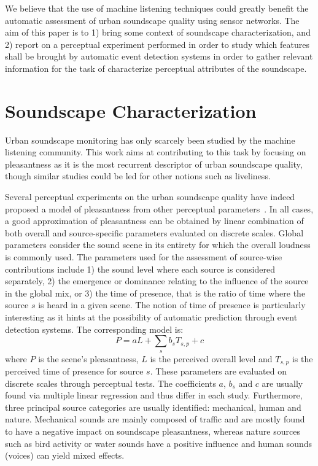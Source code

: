 \documentclass{article}
\begin{document}
\begin{sloppy}
We believe that the use of machine listening techniques could greatly benefit the automatic assessment of urban soundscape quality using sensor networks. %
The aim of this paper is to 1) bring some context of soundscape characterization, and 2) report on a perceptual experiment performed in order to study which features shall be brought by automatic event detection systems in order to gather relevant information for the task of characterize perceptual attributes of the soundscape.


\section{Soundscape Characterization}
\label{sec:char}

Urban soundscape monitoring has only scarcely been studied by the machine listening community\cite{bello2018}. This work aims at contributing to this task by focusing on pleasantness as it is the most recurrent descriptor of urban soundscape quality, though similar studies could be led for other notions such as liveliness.

Several perceptual experiments on the urban soundscape quality have indeed proposed a model of pleasantness from other perceptual parameters~\cite{nilsson2007, axelsson2010, aumond2017, ricciardi2014}. In all cases, a good approximation of pleasantness can be obtained by linear combination of both overall and source-specific parameters evaluated on discrete scales. Global parameters consider the sound scene in its entirety for which the overall loudness is commonly used. The parameters used for the assessment of source-wise contributions include 1) the sound level where each source is considered separately, 2) the emergence or dominance relating to the influence of the source in the global mix, or 3) the time of presence, that is the ratio of time where the source $s$ is heard in a given scene. The notion of time of presence is particularly interesting as it hints at the possibility of automatic prediction through event detection systems. The corresponding model is:
\begin{equation}
P = aL + \sum_s b_sT_{s,p} + c
\end{equation}
where $P$ is the scene's pleasantness, $L$ is the perceived overall level and $T_{s,p}$ is the perceived time of presence for source $s$. These parameters are evaluated on discrete scales through perceptual tests. The coefficients $a$, $b_s$ and $c$ are usually found via multiple linear regression and thus differ in each study.
Furthermore, three principal source categories are usually identified: mechanical, human and nature. Mechanical sounds are mainly composed of traffic and are mostly found to have a negative impact on soundscape pleasantness, whereas nature sources such as bird activity or water sounds have a positive influence and human sounds (voices) can yield mixed effects.



\end{sloppy}
\end{document}
